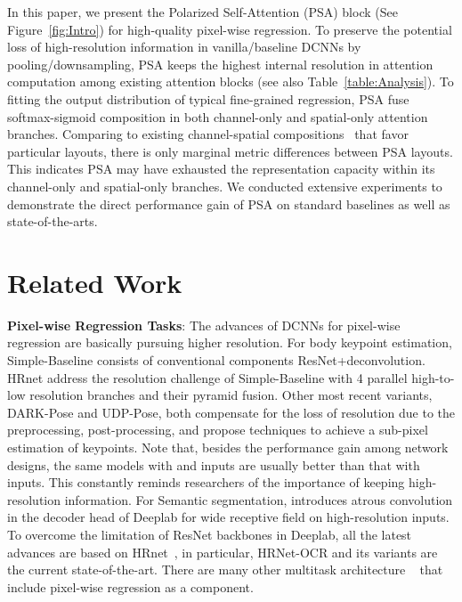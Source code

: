 \documentclass[10pt,twocolumn,letterpaper]{article}
\begin{document}
In this paper, we present the Polarized Self-Attention (PSA) block (See Figure~\ref{fig:Intro}) for high-quality pixel-wise regression. To preserve the potential loss of high-resolution information in vanilla/baseline DCNNs by pooling/downsampling, PSA keeps the highest internal resolution in attention computation among existing attention blocks (see also Table~\ref{table:Analysis}). To fitting the output distribution of typical fine-grained regression, PSA fuse softmax-sigmoid composition in both channel-only and spatial-only attention branches. Comparing to existing channel-spatial compositions~\cite{Sanghyun2018cbam,Fu2019} that favor particular layouts, there is only marginal metric differences between PSA layouts. This indicates PSA may have exhausted the representation capacity within its channel-only and spatial-only branches. We conducted extensive experiments to demonstrate the direct performance gain of PSA on standard baselines as well as state-of-the-arts.  



\section{Related Work}

\textbf{Pixel-wise Regression Tasks}: The advances of DCNNs for pixel-wise regression are basically pursuing higher resolution. For body keypoint estimation, Simple-Baseline\cite{Xiao18} consists of conventional components ResNet+deconvolution. HRnet\cite{Sun2019} address the resolution challenge of Simple-Baseline with 4 parallel high-to-low resolution branches and their pyramid fusion. Other most recent variants, DARK-Pose\cite{Zhang2020} and UDP-Pose\cite{Huang2020}, both compensate for the loss of resolution due to the preprocessing, post-processing, and propose techniques to achieve a sub-pixel estimation of keypoints.  Note that, besides the performance gain among network designs, the same models with and  inputs are usually better than that with  inputs. This constantly reminds researchers of the importance of keeping high-resolution information. For Semantic segmentation, \cite{Chen17} introduces atrous convolution in the decoder head of Deeplab for wide receptive field on high-resolution inputs. To overcome the limitation of ResNet backbones in Deeplab, all the latest advances are based on HRnet~\cite{Wang2020}, in particular, HRNet-OCR\cite{Tao2020} and its variants are the current state-of-the-art. There are many other multitask architecture ~\cite{He17,zhou2019objects,cheng2020panoptic} that include pixel-wise regression as a component. 
\end{document}
